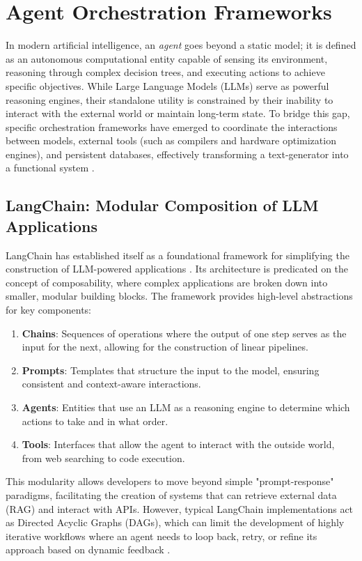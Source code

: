 \section{Agent Orchestration Frameworks}
In modern artificial intelligence, an \textit{agent} goes beyond a static model; it is defined as an autonomous computational entity capable of sensing its environment, reasoning through complex decision trees, and executing actions to achieve specific objectives.
While Large Language Models (LLMs) serve as powerful reasoning engines, their standalone utility is constrained by their inability to interact with the external world or maintain long-term state. To bridge this gap, specific orchestration frameworks have emerged to coordinate the interactions between models, external tools (such as compilers and hardware optimization engines), and persistent databases, effectively transforming a text-generator into a functional system \cite{naveed2024comprehensiveoverviewlargelanguage, su2025daao}.

\subsection{LangChain: Modular Composition of LLM Applications}
LangChain has established itself as a foundational framework for simplifying the construction of LLM-powered applications \cite{langchain}. Its architecture is predicated on the concept of composability, where complex applications are broken down into smaller, modular building blocks. The framework provides high-level abstractions for key components:
\begin{enumerate}
    \item \textbf{Chains}: Sequences of operations where the output of one step serves as the input for the next, allowing for the construction of linear pipelines.
    \item \textbf{Prompts}: Templates that structure the input to the model, ensuring consistent and context-aware interactions.
    \item \textbf{Agents}: Entities that use an LLM as a reasoning engine to determine which actions to take and in what order.
    \item \textbf{Tools}: Interfaces that allow the agent to interact with the outside world, from web searching to code execution.
\end{enumerate}
This modularity allows developers to move beyond simple "prompt-response" paradigms, facilitating the creation of systems that can retrieve external data (RAG) and interact with APIs.
However, typical LangChain implementations act as Directed Acyclic Graphs (DAGs), which can limit the development of highly iterative workflows where an agent needs to loop back, retry, or refine its approach based on dynamic feedback \cite{hong2024workflowllm}.

